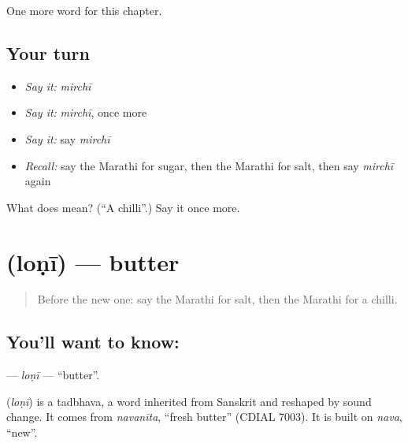 \begin{grammarlens}[title={What you've built}]
One more word for this chapter.
\end{grammarlens}

\subsection*{Your turn}
\begin{itemize}
\raggedright
  \item \emph{Say it:} \emph{mirchī}
  \item \emph{Say it:} \emph{mirchī}, once more
  \item \emph{Say it:} say \emph{mirchī}
  \item \emph{Recall:} say the Marathi for sugar, then the Marathi for salt, then say \emph{mirchī} again
\end{itemize}

\begin{tcolorbox}[breakable,colback=teal!4,colframe=teal!35!black,title={Before you move on}]
What does  mean? (\textquotedblleft{}A chilli\textquotedblright{}.) Say it once more.
\end{tcolorbox}
\section[\texorpdfstring{\mr{लोणी} (loṇī)}{लोणी (loṇī)}]{ (loṇī) — butter}

\label{lesson:MR-C87-loni}



\begin{quote}
Before the new one: say the Marathi for salt, then the Marathi for a chilli.
\end{quote}

\subsection*{You'll want to know: }
\textbf{} — \emph{loṇī} — \textquotedblleft{}butter\textquotedblright{}.

\begin{cousinweb}
\textbf{} (\emph{loṇī}) is a tadbhava, a word inherited from Sanskrit and reshaped by sound change. It comes from \emph{navanīta}, \textquotedblleft{}fresh butter\textquotedblright{} (CDIAL 7003). It is built on \emph{nava}, \textquotedblleft{}new\textquotedblright{}.
\end{cousinweb}

